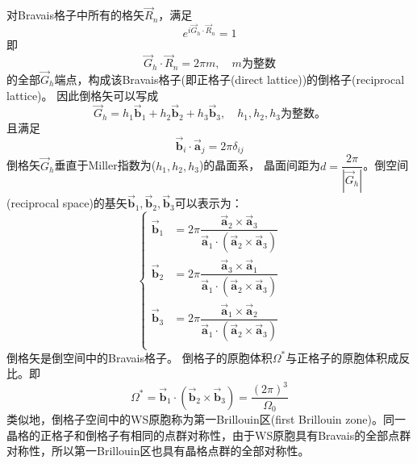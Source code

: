 对Bravais格子中所有的格矢$\vec R_n$，满足
\begin{equation}
  e^{i\vec G_h\cdot\vec R_n}=1
  \label{eq:def_recip_1}
\end{equation}
即
\begin{equation}
  \vec G_h\cdot\vec R_n=2\pi m, \quad m\mbox{为整数}
  \label{eq:def_recip_2}
\end{equation}
的全部$\vec G_h$端点，构成该Bravais格子(即正格子(direct lattice))的倒格子(reciprocal lattice)。%
因此倒格矢可以写成
\begin{equation}
  \vec G_h=h_1\vec{\mathbf b}_1+h_2\vec{\mathbf b}_2+h_3\vec{\mathbf b}_3,\quad h_1,h_2,h_3\mbox{为整数。}
   \label{eq:solid-11}
\end{equation}
且满足
\begin{equation}
   \vec{\mathbf b}_i\cdot\vec{\mathbf a}_j=2\pi\delta_{ij}
  \label{eq:solid-12}
\end{equation}
倒格矢$\vec G_h$垂直于Miller指数为($h_1,h_2,h_3$)的晶面系， 晶面间距为$d=\dfrac{2\pi}{|\vec G_h|}$。倒空间(reciprocal space)的基矢$\vec{\mathbf b}_1,\vec{\mathbf b}_2,\vec{\mathbf b}_3$可以表示为：
\begin{equation} \label{eq:solid-13}
\left\{ \begin{aligned}
  \vec{\mathbf b}_1&=2\pi \dfrac{\vec{\mathbf a}_2\times\vec{\mathbf a}_3}{\vec{\mathbf a}_1\cdot(\vec{\mathbf a}_2\times\vec{\mathbf a}_3)} \\
  \vec{\mathbf b}_2&=2\pi \dfrac{\vec{\mathbf a}_3\times\vec{\mathbf a}_1}{\vec{\mathbf a}_1\cdot(\vec{\mathbf a}_2\times\vec{\mathbf a}_3)} \\
  \vec{\mathbf b}_3&=2\pi \dfrac{\vec{\mathbf a}_1\times\vec{\mathbf a}_2}{\vec{\mathbf a}_1\cdot(\vec{\mathbf a}_2\times\vec{\mathbf a}_3)} \\
\end{aligned} \right.
\end{equation}
倒格矢是倒空间中的Bravais格子。%
倒格子的原胞体积$\Omega^{\ast}$与正格子的原胞体积成反比。即
\begin{equation}
  \Omega^{\ast}=\vec{\mathbf b}_1\cdot(\vec{\mathbf b}_2\times\vec{\mathbf b}_3)=\dfrac{(2\pi)^3}{\Omega_0}
  \label{eq:solid-14}
\end{equation}
类似地，倒格子空间中的WS原胞称为第一Brillouin区(first Brillouin zone)。同一晶格的正格子和倒格子有相同的点群对称性，由于WS原胞具有Bravais的全部点群对称性，所以第一Brillouin区也具有晶格点群的全部对称性。


